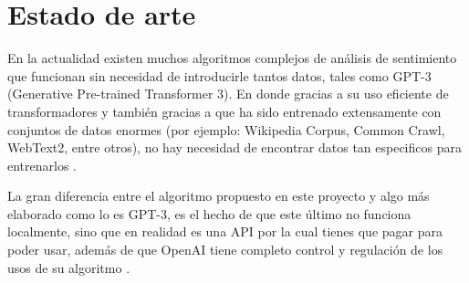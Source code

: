\documentclass[a4]{sciposter}
\begin{document}
\begin{multicols}{3}
\begin{figure}
\end{figure}

\section{Estado de arte}

En la actualidad existen muchos algoritmos complejos de análisis de sentimiento que funcionan sin necesidad de introducirle tantos datos, tales como GPT-3 (Generative Pre-trained Transformer 3). En donde gracias a su uso eficiente de transformadores y también gracias a que ha sido entrenado extensamente con conjuntos de datos enormes (por ejemplo: Wikipedia Corpus, Common Crawl, WebText2, entre otros), no hay necesidad de encontrar datos tan especificos para entrenarlos \citep{gpt3}.




La gran diferencia entre el algoritmo propuesto en este proyecto y algo más elaborado como lo es GPT-3, es el hecho de que este último no funciona localmente, sino que en realidad es una API por la cual tienes que pagar para poder usar, además de que OpenAI tiene completo control y regulación de los usos de su algoritmo \citep{openai}. 


\end{multicols}
\end{document}
